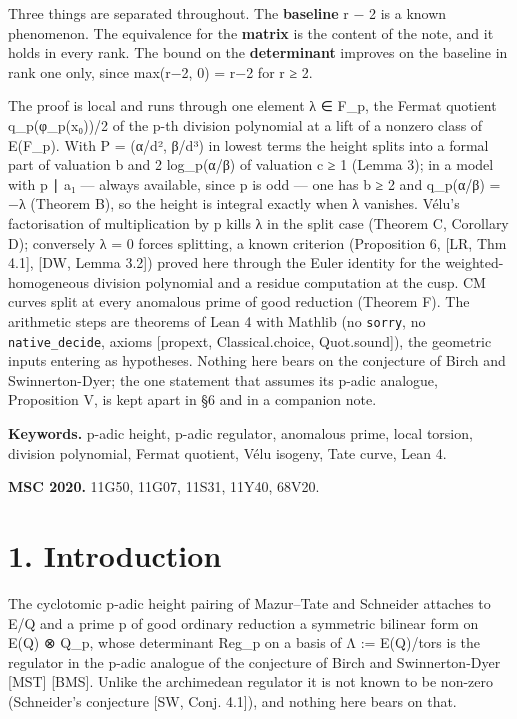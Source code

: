 \documentclass[11pt,a4paper]{article}
\theoremstyle{named}
\begin{document}
Three things are separated throughout. The \textbf{baseline} r − 2 is a known phenomenon. The equivalence for the \textbf{matrix} is the content of the note, and it holds in every rank. The bound on the \textbf{determinant} improves on the baseline in rank one only, since max(r−2, 0) = r−2 for r ≥ 2.

The proof is local and runs through one element λ ∈ F\_p, the Fermat quotient q\_p(φ\_p(x₀))/2 of the p-th division polynomial at a lift of a nonzero class of E(F\_p). With P = (α/d², β/d³) in lowest terms the height splits into a formal part of valuation b and 2 log\_p(α/β) of valuation c ≥ 1 (Lemma 3); in a model with p ∣ a₁ — always available, since p is odd — one has b ≥ 2 and q\_p(α/β) = −λ (Theorem B), so the height is integral exactly when λ vanishes. Vélu's factorisation of multiplication by p kills λ in the split case (Theorem C, Corollary D); conversely λ = 0 forces splitting, a known criterion (Proposition 6, [LR, Thm 4.1], [DW, Lemma 3.2]) proved here through the Euler identity for the weighted-homogeneous division polynomial and a residue computation at the cusp. CM curves split at every anomalous prime of good reduction (Theorem F). The arithmetic steps are theorems of Lean 4 with Mathlib (no \texttt{sorry}, no \texttt{native\_\allowbreak{}decide}, axioms [propext, Classical.choice, Quot.sound]), the geometric inputs entering as hypotheses. Nothing here bears on the conjecture of Birch and Swinnerton-Dyer; the one statement that assumes its p-adic analogue, Proposition V, is kept apart in §6 and in a companion note.

\textbf{Keywords.} p-adic height, p-adic regulator, anomalous prime, local torsion, division polynomial, Fermat quotient, Vélu isogeny, Tate curve, Lean 4.

\textbf{MSC 2020.} 11G50, 11G07, 11S31, 11Y40, 68V20.

\section*{1. Introduction}

The cyclotomic p-adic height pairing of Mazur–Tate and Schneider attaches to E/Q and a prime p of good ordinary reduction a symmetric bilinear form on E(Q) ⊗ Q\_p, whose determinant Reg\_p on a basis of Λ := E(Q)/tors is the regulator in the p-adic analogue of the conjecture of Birch and Swinnerton-Dyer [MST] [BMS]. Unlike the archimedean regulator it is not known to be non-zero (Schneider's conjecture [SW, Conj. 4.1]), and nothing here bears on that.
\end{document}
